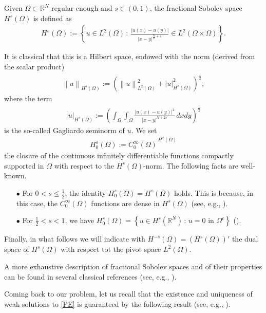 \documentclass[reqno,twoside]{amsart}
\numberwithin{equation}{section}
\def\RR{{\mathbb{R}}}
\newcommand{\norm}[2]{{\left\|#1\right\|}_{#2}}
\begin{document}
Given $\Omega\subset\RR^N$ regular enough and $s\in(0,1)$, the fractional Sobolev space $H^s({\Omega})$ is defined as
\begin{align*}
	H^s(\Omega):= \left\{u\in L^2(\Omega)\,:\, \frac{|u(x)-u(y)|}{|x-y|^{\frac N2+s}}\in L^2(\Omega\times\Omega)\right\}.
\end{align*}

It is classical that this is a Hilbert space, endowed with the norm (derived from the scalar product)
\begin{align*}
	\norm{u}{H^s(\Omega)} := \left(\norm{u}{L^2(\Omega)}^2 + |u|_{H^s(\Omega)}^2\right)^{\frac 12},
\end{align*}
where the term 
\begin{align*}
	|u|_{H^s(\Omega)}:= \left(\int_\Omega\int_\Omega \frac{|u(x)-u(y)|^2}{|x-y|^{N+2s}}\,dxdy\right)^{\frac 12}
\end{align*}
is the so-called Gagliardo seminorm of $u$. We set 
\begin{align*}
	H_0^s(\Omega):= \overline{C_0^\infty(\Omega)}^{\,H^s(\Omega)}
\end{align*}
the closure of the continuous infinitely differentiable functions compactly supported in $\Omega$ with respect to the $H^s(\Omega)$-norm. The following facts are well-known.
\begin{itemize}
	\item[$\bullet$] For $0<s\leq\frac 12$, the identity $H_0^s(\Omega) = H^s(\Omega)$ holds. This is because, in this case, the $C_0^\infty(\Omega)$ functions are dense in $H^s(\Omega)$ (see, e.g., \cite[Theorem 11.1]{jllions1972non}).
	
	\item[$\bullet$] For $\frac 12<s<1$, we have $H_0^s(\Omega)=\left\{ u\in H^s(\RR^N)\,:\,u=0\textrm{ in } \Omega^c\right\}$ (\cite{fiscella2015density}).
\end{itemize}

Finally, in what follows we will indicate with $H^{-s}(\Omega)=\left(H^s(\Omega)\right)'$ the dual space of $H^s(\Omega)$ with respect tot the pivot space $L^2(\Omega)$.

A more exhaustive description of fractional Sobolev spaces and of their properties can be found in several classical references (see, e.g., \cite{adams2003sobolev,dihitchhiker,jllions1972non}).

Coming back to our problem, let us recall that the existence and uniqueness of weak solutions to \eqref{PE} is guaranteed by the following result (see, e.g., \cite[Proposition 1.2.23]{peradottolaplaciano}).
\end{document}

